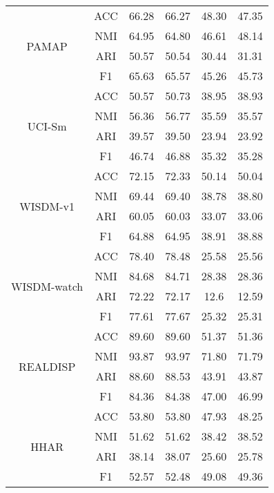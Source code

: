 \documentclass[wcp]{jmlr}
\begin{document}
\begin{table}
{\begin{tabular}{|*{6}{c|}}
    \multirow{4}{6em}{PAMAP}        & ACC & 66.28 & 66.27 & 48.30 & 47.35 \\ 
                                    & NMI & 64.95 & 64.80 & 46.61 & 48.14 \\
                                    & ARI & 50.57 & 50.54 & 30.44 & 31.31 \\
                                    & F1 & 65.63 & 65.57 & 45.26 & 45.73 \\
                            \hline
    \multirow{4}{6em}{UCI-Sm}       & ACC & 50.57 & 50.73 & 38.95 & 38.93 \\ 
                                    & NMI & 56.36 & 56.77 & 35.59 & 35.57 \\
                                    & ARI & 39.57 & 39.50 & 23.94 & 23.92 \\
                                    & F1 & 46.74 & 46.88 & 35.32 & 35.28 \\
                             \hline
    \multirow{4}{6em}{WISDM-v1}     & ACC & 72.15 & 72.33 & 50.14 & 50.04 \\ 
                                    & NMI & 69.44 & 69.40 & 38.78 & 38.80 \\
                                    & ARI & 60.05 & 60.03 & 33.07 & 33.06 \\
                                    & F1 & 64.88 & 64.95 & 38.91 & 38.88 \\
                             \hline
    \multirow{4}{6em}{WISDM-watch}     & ACC & 78.40 & 78.48 & 25.58 & 25.56 \\ 
                                    & NMI & 84.68 & 84.71 & 28.38 & 28.36 \\
                                    & ARI & 72.22 & 72.17 & 12.6 & 12.59 \\
                                    & F1 & 77.61 & 77.67 & 25.32 & 25.31 \\
                             \hline
    \multirow{4}{6em}{REALDISP}     & ACC & 89.60 & 89.60 & 51.37 & 51.36 \\ 
                                    & NMI & 93.87 & 93.97 & 71.80 & 71.79 \\
                                    & ARI & 88.60 & 88.53 & 43.91 & 43.87 \\
                                    & F1 & 84.36 & 84.38 & 47.00 & 46.99 \\
                             \hline
    \multirow{4}{6em}{HHAR}         & ACC & 53.80    & 53.80  & 47.93  & 48.25 \\
                                    & NMI & 51.62    & 51.62  & 38.42  & 38.52 \\
                                    & ARI & 38.14    & 38.07  & 25.60  & 25.78 \\
                                    & F1 & 52.57    & 52.48  & 49.08  & 49.36 \\
   \hline
  \end{tabular}}
  
\end{table}
\end{document}
